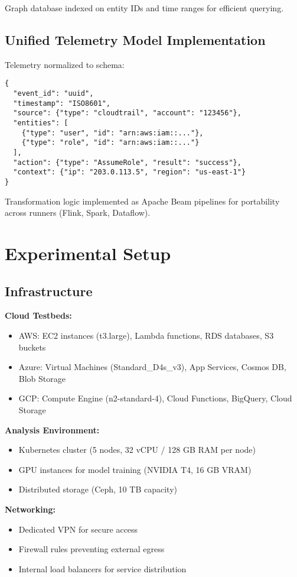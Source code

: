 Graph database indexed on entity IDs and time ranges for efficient querying.

\subsection{Unified Telemetry Model Implementation}
Telemetry normalized to schema:
\begin{verbatim}
{
  "event_id": "uuid",
  "timestamp": "ISO8601",
  "source": {"type": "cloudtrail", "account": "123456"},
  "entities": [
    {"type": "user", "id": "arn:aws:iam::..."},
    {"type": "role", "id": "arn:aws:iam::..."}
  ],
  "action": {"type": "AssumeRole", "result": "success"},
  "context": {"ip": "203.0.113.5", "region": "us-east-1"}
}
\end{verbatim}

Transformation logic implemented as Apache Beam pipelines for portability across runners (Flink, Spark, Dataflow).

\section{Experimental Setup}\label{sec:method-experimental}
\subsection{Infrastructure}
\textbf{Cloud Testbeds:}
\begin{itemize}
    \item AWS: EC2 instances (t3.large), Lambda functions, RDS databases, S3 buckets
    \item Azure: Virtual Machines (Standard\_D4s\_v3), App Services, Cosmos DB, Blob Storage
    \item GCP: Compute Engine (n2-standard-4), Cloud Functions, BigQuery, Cloud Storage
\end{itemize}

\textbf{Analysis Environment:}
\begin{itemize}
    \item Kubernetes cluster (5 nodes, 32 vCPU / 128 GB RAM per node)
    \item GPU instances for model training (NVIDIA T4, 16 GB VRAM)
    \item Distributed storage (Ceph, 10 TB capacity)
\end{itemize}

\textbf{Networking:}
\begin{itemize}
    \item Dedicated VPN for secure access
    \item Firewall rules preventing external egress
    \item Internal load balancers for service distribution
\end{itemize}

